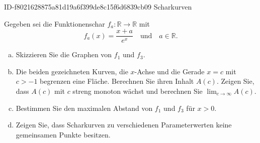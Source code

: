 \begin{exercise}
      {ID-f8021628875a81d19a6f399de8c15f6d6839cb09}
      {Scharkurven}
  \ifproblem\problem\par
    Gegeben sei die Funktionenschar $f_a:\mathbb{R}\to\mathbb{R}$ mit
    \begin{equation*}
      f_a(x)=\frac{x+a}{e^x}
      \quad\text{und}\quad
      a\in\mathbb{R}.
    \end{equation*}
    \begin{enumerate}[a)]
      \item Skizzieren Sie die Graphen von $f_1$ und $f_3$.
      \item Die beiden gezeichneten Kurven, die
            $x$-Achse und die Gerade $x=c$ mit $c>-1$
            begrenzen eine Fläche.
            Berechnen Sie ihren Inhalt $A(c)$.
            Zeigen Sie, dass $A(c)$ mit $c$ streng
            monoton wächst und berechnen Sie
            $\displaystyle\lim_{c\to\infty}A(c)$.
      \item Bestimmen Sie den maximalen Abstand von
            $f_1$ und $f_3$ für $x>0$.
      \item Zeigen Sie, dass Scharkurven zu verschiedenen
            Parameterwerten keine gemeinsamen Punkte
            besitzen.
    \end{enumerate}
  \fi
\end{exercise}
